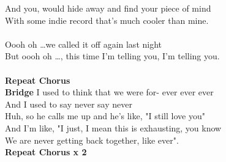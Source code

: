 And you,  would hide away and find your piece of  mind\\
With some  indie record that's much  cooler than mine.\\
 \\
 Oooh  oh …we  called it off  again last night\\
But  oooh  oh …, this  time I'm  telling you, I'm telling you.\\
 \\
\textbf{Repeat Chorus}\\
\textbf{Bridge}  I used to  think that  we were for- ever ever ever\\
And  I used to  say  never say  never\\
 Huh, so he  calls me up and he's like, "I still  love you"\\
And I'm  like, "I just, I mean  this is exhausting, you  know\\
We are never getting  back together, like ever".\\
\textbf{Repeat Chorus x 2}  \\
